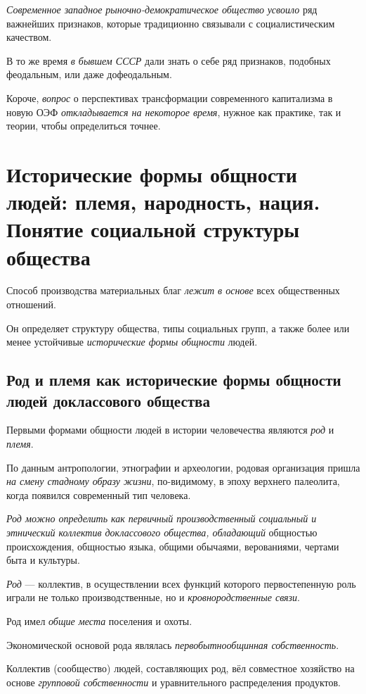\documentclass[a4paper,14pt,russian]{extreport}
\begin{document}
\emph{Современное западное рыночно-демократическое общество} \emph{усвоило} ряд важнейших признаков, которые традиционно связывали с социалистическим качеством.

В то же время \emph{в бывшем СССР} дали знать о себе ряд признаков, подобных феодальным, или даже дофеодальным.

Короче, \emph{вопрос} о перспективах трансформации современного капитализма в новую ОЭФ \emph{откладывается на некоторое время}, нужное как практике, так и теории, чтобы определиться точнее.

\section{Исторические формы общности людей: племя, народность, нация. Понятие социальной структуры общества}

Способ производства материальных благ \emph{лежит в основе} всех общественных отношений.

Он определяет структуру общества, типы социальных групп, а также более или менее устойчивые \emph{исторические формы общности} людей.

\subsection{Род и племя как исторические формы общности людей доклассового общества}

Первыми формами общности людей в истории человечества являются \emph{род} и \emph{племя}.

По данным антропологии, этнографии и археологии, родовая организация пришла \emph{на смену стадному образу жизни}, по-видимому, в эпоху верхнего палеолита, когда появился современный тип человека.

\emph{Род можно определить как первичный производственный социальный и этнический коллектив доклассового общества, обладающий} общностью происхождения, общностью языка, общими обычаями, верованиями, чертами быта и культуры.

\emph{Род} --- коллектив, в осуществлении всех функций которого первостепенную роль играли не только производственные, но и \emph{кровнородственные связи}.

Род имел \emph{общие места} поселения и охоты.

Экономической основой рода являлась \emph{первобытнообщинная собственность}.

Коллектив (сообщество) людей, составляющих род, вёл совместное хозяйство на основе \emph{групповой собственности} и уравнительного распределения продуктов.
\end{document}
